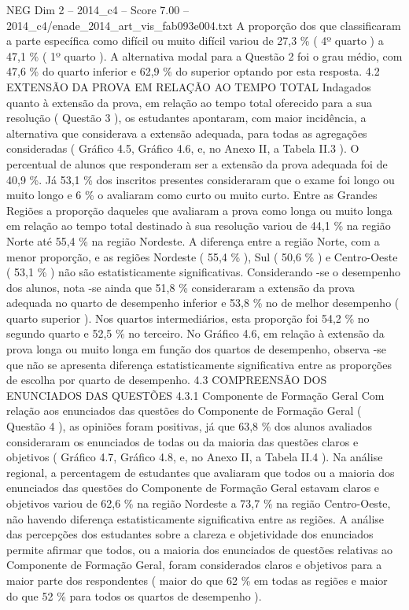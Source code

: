 \begin{textsample}{NEG Dim 2 – 2014\_c4 – Score 7.00 – 2014\_c4/enade\_2014\_art\_vis\_fab093e004.txt}
A proporção dos que classificaram a parte específica como difícil ou muito difícil variou de 27,3 \% ( 4º quarto ) a 47,1 \% ( 1º quarto ).
A alternativa modal para a Questão 2 foi o grau médio, com 47,6 \% do quarto inferior e 62,9 \% do superior optando por esta resposta. 4.2 EXTENSÃO DA PROVA EM RELAÇÃO AO TEMPO TOTAL Indagados quanto à extensão da prova, em relação ao tempo total oferecido para a sua resolução ( Questão 3 ), os estudantes apontaram, com maior incidência, a alternativa que considerava a extensão adequada, para todas as agregações consideradas ( Gráfico 4.5, Gráfico 4.6, e, no Anexo II, a Tabela II.3 ).
O percentual de alunos que responderam ser a extensão da prova adequada foi de 40,9 \%.
Já 53,1 \% dos inscritos presentes consideraram que o exame foi longo ou muito longo e 6 \% o avaliaram como curto ou muito curto.
Entre as Grandes Regiões a proporção daqueles que avaliaram a prova como longa ou muito longa em relação ao tempo total destinado à sua resolução variou de 44,1 \% na região Norte até 55,4 \% na região Nordeste.
A diferença entre a região Norte, com a menor proporção, e as regiões Nordeste ( 55,4 \% ), Sul ( 50,6 \% ) e Centro-Oeste ( 53,1 \% ) não são estatisticamente significativas.
Considerando -se o desempenho dos alunos, nota -se ainda que 51,8 \% consideraram a extensão da prova adequada no quarto de desempenho inferior e 53,8 \% no de melhor desempenho ( quarto superior ).
Nos quartos intermediários, esta proporção foi 54,2 \% no segundo quarto e 52,5 \% no terceiro.
No Gráfico 4.6, em relação à extensão da prova longa ou muito longa em função dos quartos de desempenho, observa -se que não se apresenta diferença estatisticamente significativa entre as proporções de escolha por quarto de desempenho. 4.3 COMPREENSÃO DOS ENUNCIADOS DAS QUESTÕES 4.3.1 Componente de Formação Geral Com relação aos enunciados das questões do Componente de Formação Geral ( Questão 4 ), as opiniões foram positivas, já que 63,8 \% dos alunos avaliados consideraram os enunciados de todas ou da maioria das questões claros e objetivos ( Gráfico 4.7, Gráfico 4.8, e, no Anexo II, a Tabela II.4 ).
Na análise regional, a percentagem de estudantes que avaliaram que todos ou a maioria dos enunciados das questões do Componente de Formação Geral estavam claros e objetivos variou de 62,6 \% na região Nordeste a 73,7 \% na região Centro-Oeste, não havendo diferença estatisticamente significativa entre as regiões.
A análise das percepções dos estudantes sobre a clareza e objetividade dos enunciados permite afirmar que todos, ou a maioria dos enunciados de questões relativas ao Componente de Formação Geral, foram considerados claros e objetivos para a maior parte dos respondentes ( maior do que 62 \% em todas as regiões e maior do que 52 \% para todos os quartos de desempenho ).

\end{textsample}
